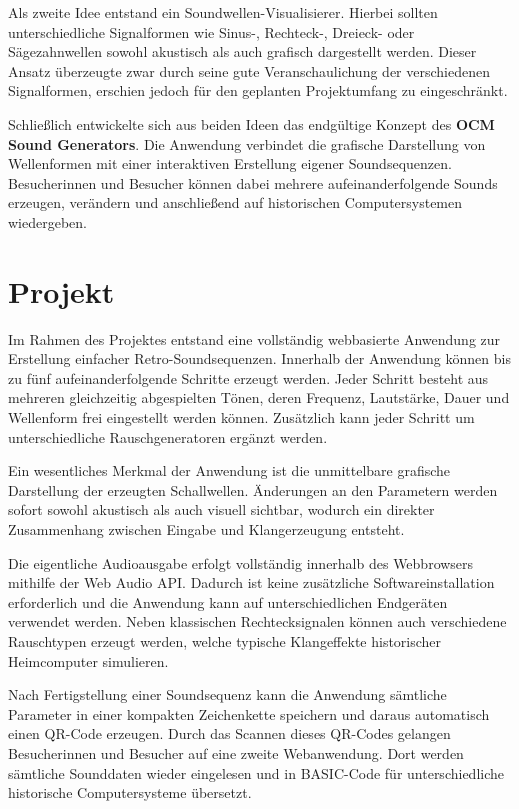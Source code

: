 Als zweite Idee entstand ein Soundwellen-Visualisierer. Hierbei sollten unterschiedliche
Signalformen wie Sinus-, Rechteck-, Dreieck- oder Sägezahnwellen sowohl akustisch als
auch grafisch dargestellt werden. Dieser Ansatz überzeugte zwar durch seine gute
Veranschaulichung der verschiedenen Signalformen, erschien jedoch für den geplanten
Projektumfang zu eingeschränkt.

Schließlich entwickelte sich aus beiden Ideen das endgültige Konzept des
\textbf{OCM Sound Generators}. Die Anwendung verbindet die grafische Darstellung von
Wellenformen mit einer interaktiven Erstellung eigener Soundsequenzen. Besucherinnen
und Besucher können dabei mehrere aufeinanderfolgende Sounds erzeugen, verändern und
anschließend auf historischen Computersystemen wiedergeben.

\section{Projekt}

Im Rahmen des Projektes entstand eine vollständig webbasierte Anwendung zur
Erstellung einfacher Retro-Soundsequenzen. Innerhalb der Anwendung können bis zu fünf
aufeinanderfolgende Schritte erzeugt werden. Jeder Schritt besteht aus mehreren
gleichzeitig abgespielten Tönen, deren Frequenz, Lautstärke, Dauer und Wellenform frei
eingestellt werden können. Zusätzlich kann jeder Schritt um unterschiedliche
Rauschgeneratoren ergänzt werden.

Ein wesentliches Merkmal der Anwendung ist die unmittelbare grafische Darstellung der
erzeugten Schallwellen. Änderungen an den Parametern werden sofort sowohl akustisch
als auch visuell sichtbar, wodurch ein direkter Zusammenhang zwischen Eingabe und
Klangerzeugung entsteht.

Die eigentliche Audioausgabe erfolgt vollständig innerhalb des Webbrowsers mithilfe der
Web Audio API. Dadurch ist keine zusätzliche Softwareinstallation erforderlich und die
Anwendung kann auf unterschiedlichen Endgeräten verwendet werden. Neben klassischen
Rechtecksignalen können auch verschiedene Rauschtypen erzeugt werden, welche typische
Klangeffekte historischer Heimcomputer simulieren.

Nach Fertigstellung einer Soundsequenz kann die Anwendung sämtliche Parameter in
einer kompakten Zeichenkette speichern und daraus automatisch einen QR-Code
erzeugen. Durch das Scannen dieses QR-Codes gelangen Besucherinnen und Besucher auf
eine zweite Webanwendung. Dort werden sämtliche Sounddaten wieder eingelesen und in
BASIC-Code für unterschiedliche historische Computersysteme übersetzt.

